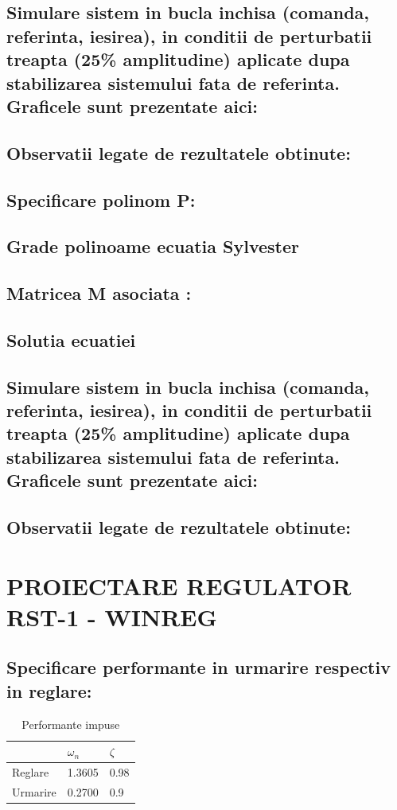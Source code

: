 \documentclass[12pt,english]{article}
\begin{document}
\subsection {Simulare sistem in bucla inchisa (comanda, referinta, iesirea), in conditii de perturbatii treapta (25\% amplitudine) aplicate dupa stabilizarea sistemului fata de referinta. Graficele sunt prezentate aici: }
\subsection {Observatii legate de rezultatele obtinute: }

\subsection {Specificare polinom P: }
\subsection {Grade polinoame ecuatia Sylvester }
\subsection {Matricea M asociata : }
\subsection {Solutia ecuatiei}
\subsection {Simulare sistem in bucla inchisa (comanda, referinta, iesirea), in conditii de perturbatii treapta (25\% amplitudine) aplicate dupa stabilizarea sistemului fata de referinta. Graficele sunt prezentate aici: }
\subsection {Observatii legate de rezultatele obtinute: }

\section {PROIECTARE REGULATOR RST-1 - WINREG }
\subsection {Specificare performante in urmarire respectiv in reglare: }
\begin{table}[H]
  \centering
    \begin{tabular}{|l|l|l|}
      \hline
       & $\omega_n$ & $\zeta$ \\
      \hline
       Reglare & 1.3605 & 0.98 \\
      \hline
       Urmarire & 0.2700 & 0.9 \\
      \hline
    \end{tabular}
    \caption{Performante impuse}
\end{table}
\end{document}
